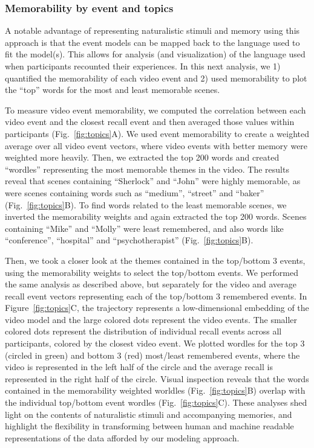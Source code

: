 \documentclass{article}
\begin{document}
\subsubsection*{Memorability by event and topics}
A notable advantage of representing naturalistic stimuli and memory using this approach is that the event models can be mapped back to the language used to fit the model(s).  This allows for analysis (and visualization) of the language used when participants recounted their experiences.  In this next analysis, we 1) quantified the memorability of each video event and 2) used memorability to plot the ``top'' words for the most and least memorable scenes.

To measure video event memorability, we computed the correlation between each video event and the closest recall event and then averaged those values within participants (Fig.~\ref{fig:topics}A). We used event memorability to create a weighted average over all video event vectors, where video events with better memory were weighted more heavily. Then, we extracted the top 200 words and created ``wordles'' representing the most memorable themes in the video. The results reveal that scenes containing ``Sherlock'' and ``John'' were highly memorable, as were scenes containing words such as ``medium'', ``street'' and ``baker'' (Fig.~\ref{fig:topics}B). To find words related to the least memorable scenes, we inverted the memorability weights and again extracted the top 200 words.  Scenes containing ``Mike'' and ``Molly'' were least remembered, and also words like ``conference'', ``hospital'' and ``psychotherapist'' (Fig.~\ref{fig:topics}B).

Then, we took a closer look at the themes contained in the top/bottom 3 events, using the memorability weights to select the top/bottom events. We performed the same analysis as described above, but separately for the video and average recall event vectors representing each of the top/bottom 3 remembered events. In Figure~\ref{fig:topics}C, the trajectory represents a low-dimensional embedding of the video model and the large colored dots represent the video events. The smaller colored dots represent the distribution of individual recall events across all participants, colored by the closest video event. We plotted wordles for the top 3 (circled in green) and bottom 3 (red) most/least remembered events, where the video is represented in the left half of the circle and the average recall is represented in the right half of the circle. Visual inspection reveals that the words contained in the memorability weighted worldles (Fig.~\ref{fig:topics}B) overlap with the individual top/bottom event wordles (Fig.~\ref{fig:topics}C). These analyses shed light on the contents of naturalistic stimuli and accompanying memories, and highlight the flexibility in transforming between human and machine readable representations of the data afforded by our modeling approach.
\end{document}
